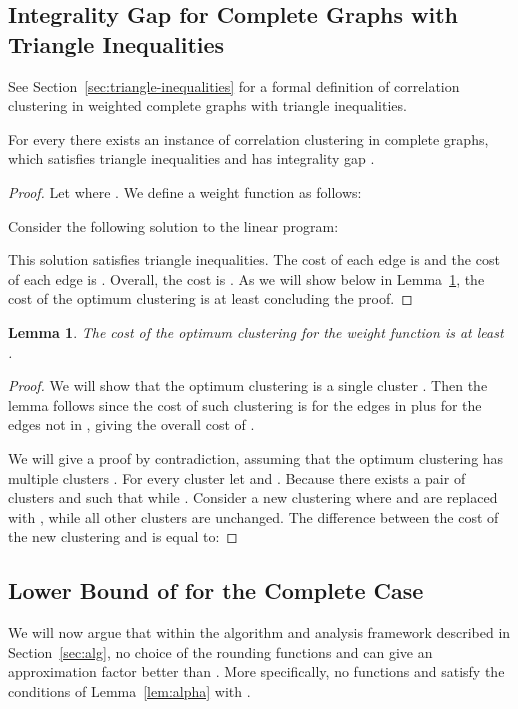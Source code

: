 \documentclass[11pt]{article}
\newtheorem{lemma}[theorem]{Lemma}
\theoremstyle{definition}
\theoremstyle{remark}
\begin{document}
\subsection{Integrality Gap for Complete Graphs with Triangle Inequalities}
See Section~\ref{sec:triangle-inequalities} for a formal definition of correlation clustering
in weighted complete graphs with triangle inequalities.
\begin{theorem}\label{thm:integrality-gap-triangle-inequalities}
For every  there exists an instance of correlation clustering in complete graphs, which satisfies triangle inequalities and has integrality gap .
\end{theorem}
\begin{proof}
Let  where .
We define a weight function  as follows:

Consider the following solution to the linear program:

This solution satisfies triangle inequalities. The cost of each edge  is  and the cost of each edge  is . Overall, the cost is .
As we will show below in Lemma~\ref{lem:clustering-cost-triangle-inequalities}, the cost of the optimum clustering is at least  concluding the proof.
\end{proof}

\begin{lemma}\label{lem:clustering-cost-triangle-inequalities}
The cost of the optimum clustering for the weight function  is at least .
\end{lemma}
\begin{proof}
We will show that the optimum clustering is a single cluster . Then the lemma follows since the cost of such clustering is  for the edges in  plus  for the edges not in , giving the overall cost of .

We will give a proof by contradiction, assuming that the optimum clustering has multiple clusters .
For every cluster  let  and .
Because  there exists a pair of clusters  and  such that  while .
Consider a new clustering where  and  are replaced with , while all other clusters are unchanged.
The difference between the cost of the new clustering and  is equal to:


\end{proof}





 \subsection{\texorpdfstring{Lower Bound of  for the Complete Case}{Lower Bound of 2.025 for the Complete Case}}\label{sec:lbd}
We will now argue that within the algorithm and analysis framework described in Section~\ref{sec:alg}, no choice of the rounding functions  and  can give an approximation factor better than . More specifically, no functions  and 
satisfy the conditions of Lemma~\ref{lem:alpha} with .
\end{document}
